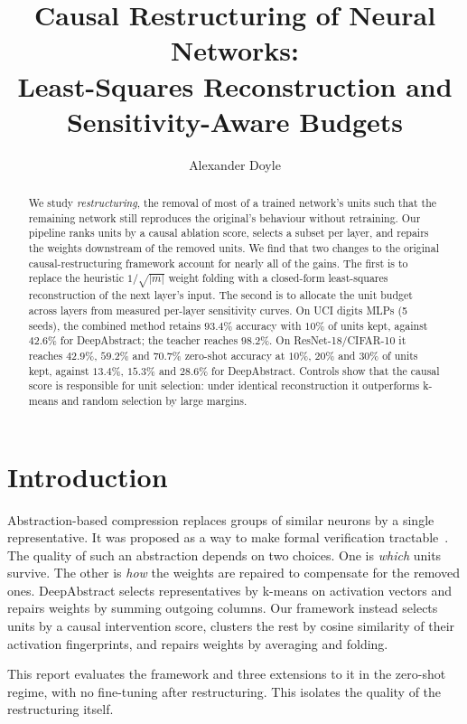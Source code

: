 \documentclass[11pt]{article}
\title{Causal Restructuring of Neural Networks:\\Least-Squares Reconstruction and Sensitivity-Aware Budgets}
\author{Alexander Doyle}
\date{}
\begin{document}
\maketitle

\begin{abstract}
We study \emph{restructuring}, the removal of most of a trained network's units such that the remaining
network still reproduces the original's behaviour without retraining. Our pipeline ranks units by a
causal ablation score, selects a subset per layer, and repairs the weights downstream of the removed units.
We find that two changes to the original causal-restructuring framework account for nearly all of the gains.
The first is to replace the heuristic $1/\sqrt{|m|}$ weight folding with a closed-form least-squares
reconstruction of the next layer's input. The second is to allocate the unit budget across layers from
measured per-layer sensitivity curves. On UCI digits MLPs (5 seeds), the combined method retains
$93.4\%$ accuracy with $10\%$ of units kept, against $42.6\%$ for DeepAbstract; the teacher reaches
$98.2\%$. On ResNet-18/CIFAR-10 it reaches $42.9\%$, $59.2\%$ and $70.7\%$ zero-shot accuracy at $10\%$,
$20\%$ and $30\%$ of units kept, against $13.4\%$, $15.3\%$ and $28.6\%$ for DeepAbstract. Controls show
that the causal score is responsible for unit selection: under identical reconstruction it outperforms
k-means and random selection by large margins.
\end{abstract}

\section{Introduction}
Abstraction-based compression replaces groups of similar neurons by a single representative. It was
proposed as a way to make formal verification tractable~\cite{ashok2020deepabstract}. The quality of such
an abstraction depends on two choices. One is \emph{which} units survive. The other is \emph{how} the
weights are repaired to compensate for the removed ones. DeepAbstract selects representatives by k-means
on activation vectors and repairs weights by summing outgoing columns. Our framework instead selects units
by a causal intervention score, clusters the rest by cosine similarity of their activation fingerprints,
and repairs weights by averaging and folding.

This report evaluates the framework and three extensions to it in the zero-shot regime, with no
fine-tuning after restructuring. This isolates the quality of the restructuring itself.
\end{document}
